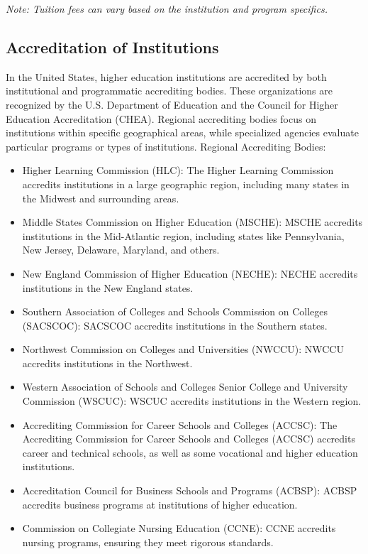 \textit{Note: Tuition fees can vary based on the institution and program specifics.}

\subsection{Accreditation of Institutions}

In the United States, higher education institutions are accredited by both institutional and programmatic accrediting bodies. These organizations are recognized by the U.S. Department of Education and the Council for Higher Education Accreditation (CHEA). Regional accrediting bodies focus on institutions within specific geographical areas, while specialized agencies evaluate particular programs or types of institutions. 
Regional Accrediting Bodies:

\begin{itemize}
    \item Higher Learning Commission (HLC): The Higher Learning Commission accredits institutions in a large geographic region, including many states in the Midwest and surrounding areas.
    \item Middle States Commission on Higher Education (MSCHE): MSCHE accredits institutions in the Mid-Atlantic region, including states like Pennsylvania, New Jersey, Delaware, Maryland, and others. 
    \item New England Commission of Higher Education (NECHE): NECHE accredits institutions in the New England states. 
    \item Southern Association of Colleges and Schools Commission on Colleges (SACSCOC): SACSCOC accredits institutions in the Southern states.
    \item Northwest Commission on Colleges and Universities (NWCCU): NWCCU accredits institutions in the Northwest.
    \item Western Association of Schools and Colleges Senior College and University Commission (WSCUC): WSCUC accredits institutions in the Western region. 
    \item Accrediting Commission for Career Schools and Colleges (ACCSC): The Accrediting Commission for Career Schools and Colleges (ACCSC) accredits career and technical schools, as well as some vocational and higher education institutions. 
    \item Accreditation Council for Business Schools and Programs (ACBSP): ACBSP accredits business programs at institutions of higher education.
    \item Commission on Collegiate Nursing Education (CCNE): CCNE accredits nursing programs, ensuring they meet rigorous standards. 

\end{itemize}

